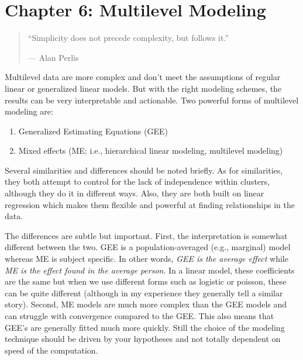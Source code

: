 \documentclass[]{tufte-book}
\providecommand{\tightlist}{%
  \setlength{\itemsep}{0pt}\setlength{\parskip}{0pt}}
\theoremstyle{definition}
\theoremstyle{definition}
\theoremstyle{remark}
\begin{document}
\chapter*{Chapter 6: Multilevel
Modeling}\label{chapter-6-multilevel-modeling}

\begin{quote}
``Simplicity does not precede complexity, but follows it.''

--- Alan Perlis
\end{quote}

Multilevel data are more complex and don't meet the assumptions of
regular linear or generalized linear models. But with the right modeling
schemes, the results can be very interpretable and actionable. Two
powerful forms of multilevel modeling are:

\begin{enumerate}
\def\labelenumi{\arabic{enumi}.}
\tightlist
\item
  Generalized Estimating Equations (GEE)
\item
  Mixed effects (ME; i.e., hierarchical linear modeling, multilevel
  modeling)
\end{enumerate}

Several similarities and differences should be noted briefly. As for
similarities, they both attempt to control for the lack of independence
within clusters, although they do it in different ways. Also, they are
both built on linear regression which makes them flexible and powerful
at finding relationships in the data.

The differences are subtle but important. First, the interpretation is
somewhat different between the two. GEE is a population-averaged (e.g.,
marginal) model whereas ME is subject specific. In other words,
\emph{GEE is the average effect} while \emph{ME is the effect found in
the average person}. In a linear model, these coefficients are the same
but when we use different forms such as logistic or poisson, these can
be quite different (although in my experience they generally tell a
similar story). Second, ME models are much more complex than the GEE
models and can struggle with convergence compared to the GEE. This also
means that GEE's are generally fitted much more quickly. Still the
choice of the modeling technique should be driven by your hypotheses and
not totally dependent on speed of the computation.
\end{document}

